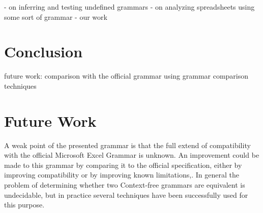 \documentclass[conference]{IEEEtran}
\begin{document}
- on inferring and testing undefined grammars
- on analyzing spreadsheets using some sort of grammar
- our work

\section{Conclusion}
\label{section:conclusion}
future work:
comparison with the official grammar using grammar comparison techniques

\section{Future Work}

A weak point of the presented grammar is that the full extend of compatibility with the official Microsoft Excel Grammar is unknown.
An improvement could be made to this grammar by comparing it to the official specification, either by improving compatibility or by improving known limitations,.
In general the problem of determining whether two Context-free grammars are equivalent is undecidable, but in practice several techniques have been successfully used for this purpose.




\end{document}
